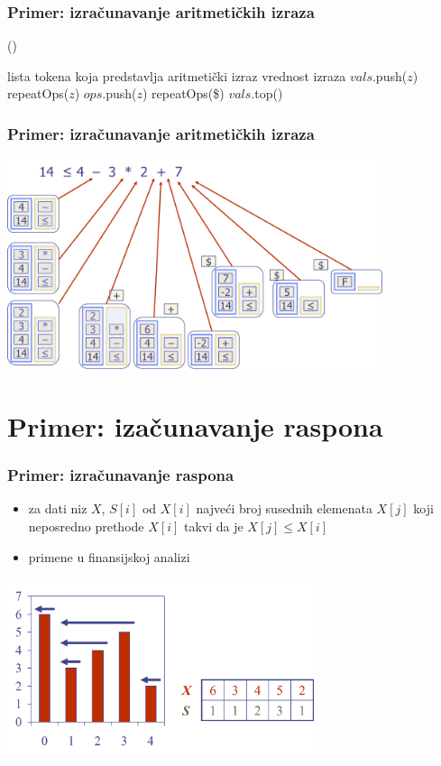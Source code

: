 \documentclass[compress,aspectratio=169]{beamer}
\begin{document}
\begin{frame}[fragile]
  \frametitle{Primer: izračunavanje aritmetičkih izraza}
()
\begin{algorithmic}
\REQUIRE lista tokena koja predstavlja aritmetički izraz
\ENSURE vrednost izraza
    \STATE $vals$.push($z$)
  \ELSE
    \STATE repeatOps($z$)
    \STATE $ops$.push($z$)
  \ENDIF
\ENDWHILE
\STATE repeatOps(\$)
\RETURN $vals$.top()
\end{algorithmic}
\end{frame}

\begin{frame}[fragile]
  \frametitle{Primer: izračunavanje aritmetičkih izraza}
  \begin{center}
    \includegraphics[width=11cm]{asp-05-pic05.png}
  \end{center}
\end{frame}

\section[P: Raspon]{Primer: izačunavanje raspona}
\begin{frame}[fragile]
  \frametitle{Primer: izračunavanje raspona}
  \begin{itemize}
    \item za dati niz $X$,  $S[i]$ od $X[i]$ najveći broj susednih 
    elemenata $X[j]$ koji neposredno prethode $X[i]$ takvi da je $X[j]\leq X[i]$
    \item primene u finansijskoj analizi 
  \end{itemize}
  \begin{center}
    \includegraphics[width=9cm]{asp-05-pic06.png}
  \end{center}
\end{frame}
\end{document}
